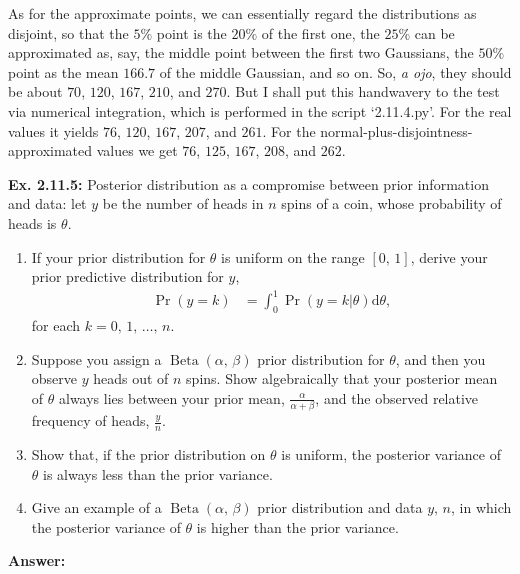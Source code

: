 \documentclass{article}
\newcommand\oname\operatorname
\begin{document}
As for the approximate points, we can essentially regard the distributions as disjoint, so that the $5\%$ point is the $20\%$ of the first one, the $25\%$ can be approximated as, say, the middle point between the first two Gaussians, the $50\%$ point as the mean $166.7$ of the middle Gaussian, and so on. So, \textit{a ojo}, they should be about $70$, $120$, $167$, $210$, and $270$. But I shall put this handwavery to the test via numerical integration, which is performed in the script `2.11.4.py'. For the real values it yields $76$, $120$, $167$, $207$, and $261$. For the normal-plus-disjointness-approximated values we get $76$, $125$, $167$, $208$, and $262$.

\textbf{Ex. 2.11.5: }Posterior distribution as a compromise between prior information and data: let $y$ be the number of heads in $n$ spins of a coin, whose probability of heads is $\theta$.
\begin{enumerate}[label=\alph*]
	\item If your prior distribution for $\theta$ is uniform on the range $[0,\,1]$, derive your prior predictive distribution for $y$,
		\begin{align*}
			\oname{Pr}(y=k)&=\int_0^1\oname{Pr}(y=k|\theta)\mathrm d\theta,
		\end{align*}
		for each $k=0,\,1,\,\ldots,\,n$.
	\item Suppose you assign a $\oname{Beta}(\alpha,\,\beta)$ prior distribution for $\theta$, and then you observe $y$ heads out of $n$ spins. Show algebraically that your posterior mean of $\theta$ always lies between your prior mean, $\frac{\alpha}{\alpha+\beta}$, and the observed relative frequency of heads, $\frac{y}n$.
	\item Show that, if the prior distribution on $\theta$ is uniform, the posterior variance of $\theta$ is always less than the prior variance.
	\item Give an example of a $\oname{Beta}(\alpha,\,\beta)$ prior distribution and data $y,\,n$, in which the posterior variance of $\theta$ is higher than the prior variance.
\end{enumerate}

\textbf{Answer:}
\end{document}
